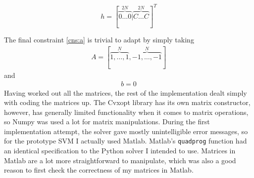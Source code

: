 \documentclass[11pt,twoside,notitlepage]{report}
\begin{document}
\[h = [\overbrace{0 \dots 0}^{2N}|\overbrace{C \dots C}^{2N}]^T\]

The final constraint \ref{cns:a} is trivial to adapt by simply taking 
\begin{gather*}
A=[\overbrace{1,\dots,1}^N,\overbrace{-1,\dots,-1}^N]
\end{gather*}
and
\begin{gather*}
b=0
\end{gather*}
Having worked out all the matrices, the rest of the implementation dealt simply
with coding the matrices up. The Cvxopt library has its own matrix constructor,
however, has generally limited functionality when it comes to matrix
operations, so Numpy was used a lot for matrix manipulations. During the first
implementation attempt, the solver gave mostly unintelligible error messages,
so for the prototype SVM I actually used Matlab. Matlab's \texttt{quadprog}
function had an identical specification to the Python solver I intended to use.
Matrices in Matlab are a lot more straightforward to manipulate, which was also
a good reason to first check the correctness of my matrices in Matlab.
\end{document}
